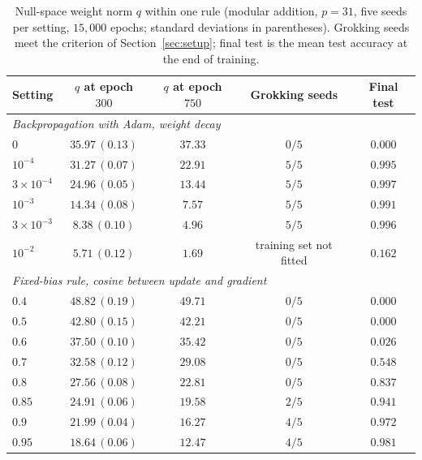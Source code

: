 \documentclass{article} %
\begin{document}
\begin{table}[!ht]
\caption{Null-space weight norm $q$ within one rule (modular addition, $p=31$, five seeds per setting, $15{,}000$ epochs; standard deviations in parentheses). Grokking seeds meet the criterion of Section~\ref{sec:setup}; final test is the mean test accuracy at the end of training.}
\label{tab:withinrule}
\begin{center}
\small
\begin{tabular}{lcccc}
\toprule
Setting & $q$ at epoch $300$ & $q$ at epoch $750$ & Grokking seeds & Final test \\
\midrule
\multicolumn{5}{l}{\emph{Backpropagation with Adam, weight decay}} \\
$0$ & $35.97\,(0.13)$ & $37.33$ & $0/5$ & $0.000$ \\
$10^{-4}$ & $31.27\,(0.07)$ & $22.91$ & $5/5$ & $0.995$ \\
$3\times10^{-4}$ & $24.96\,(0.05)$ & $13.44$ & $5/5$ & $0.997$ \\
$10^{-3}$ & $14.34\,(0.08)$ & $7.57$ & $5/5$ & $0.991$ \\
$3\times10^{-3}$ & $8.38\,(0.10)$ & $4.96$ & $5/5$ & $0.996$ \\
$10^{-2}$ & $5.71\,(0.12)$ & $1.69$ & training set not fitted & $0.162$ \\
\midrule
\multicolumn{5}{l}{\emph{Fixed-bias rule, cosine between update and gradient}} \\
$0.4$ & $48.82\,(0.19)$ & $49.71$ & $0/5$ & $0.000$ \\
$0.5$ & $42.80\,(0.15)$ & $42.21$ & $0/5$ & $0.000$ \\
$0.6$ & $37.50\,(0.10)$ & $35.42$ & $0/5$ & $0.026$ \\
$0.7$ & $32.58\,(0.12)$ & $29.08$ & $0/5$ & $0.548$ \\
$0.8$ & $27.56\,(0.08)$ & $22.81$ & $0/5$ & $0.837$ \\
$0.85$ & $24.91\,(0.06)$ & $19.58$ & $2/5$ & $0.941$ \\
$0.9$ & $21.99\,(0.04)$ & $16.27$ & $4/5$ & $0.972$ \\
$0.95$ & $18.64\,(0.06)$ & $12.47$ & $4/5$ & $0.981$ \\
\bottomrule
\end{tabular}
\end{center}
\end{table}
\end{document}
